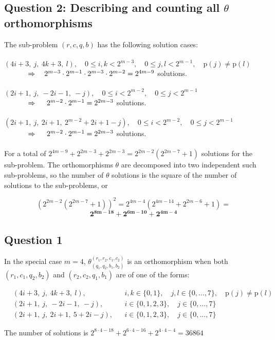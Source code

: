 \documentclass[11pt]{llncs}
\begin{document}
\subsection{Question 2: Describing and counting all $\theta$ orthomorphisms}

The sub-problem $(r,c,q,b)$ has the following solution cases:\\\\
$(4i+3,\ j,\ 4k+3,\ l),\quad 0 \leq i, k < 2^{m-3},\quad 0 \leq j, l < 2^{m-1},\quad\text{p}(j)\neq\text{p}(l)$\\
$\hphantom{ }\quad\quad\quad\Rightarrow\quad 2^{m-3} \cdot 2^{m-1} \cdot 2^{m-3} \cdot 2^{m-2} = 2^{4m-9}$ solutions.\\\\
$(2i+1,\ j,\ -2i-1,\ -j),\quad 0 \leq i < 2^{m-2},\quad 0 \leq j < 2^{m-1}$\\
$\hphantom{ }\quad\quad\quad\Rightarrow\quad\ 2^{m-2} \cdot 2^{m-1} = 2^{2m-3}$ solutions.\\\\
$(2i+1,\ j,\ 2i+1,\ 2^{m-2}+2i+1-j),\quad 0 \leq i < 2^{m-2},\quad 0 \leq j < 2^{m-1}$\\
$\hphantom{ }\quad\quad\quad\Rightarrow\quad\ 2^{m-2} \cdot 2^{m-1} = 2^{2m-3}$ solutions.\\\\
For a total of $2^{4m-9} + 2^{2m-3} + 2^{2m-3} = 2^{2m-2}(2^{2m-7}+1)$ solutions for the sub-problem. The orthomorphisms $\theta$ are decomposed into two independent such sub-problems, so the number of $\theta$ solutions is the square of the number of solutions to the sub-problems, or

\[ (2^{2m-2}(2^{2m-7}+1))^2 = 2^{4m-4}(2^{4m-14} + 2^{2m-6} + 1) = \]
\LARGE \[ \mathbf{ 2^{8m-18} + 2^{6m-10} + 2^{4m-4} } \] \normalsize

\subsection{Question 1}

In the special case $m=4$, $\theta^{(r_1, r_2, c_1, c_2)}_{(q_1, q_2, b_1, b_2)}$ is an orthomorphism when both $(r_1, c_1, q_2, b_2)$ and $(r_2, c_2, q_1, b_1)$ are of one of the forms:

\[ \begin{aligned}
& (4i+3,\ j,\ 4k+3,\ l),& & i, k \in \{0,1\},\quad j, l \in \{0,\dots,7\},\quad\text{p}(j)\neq\text{p}(l) \\
& (2i+1,\ j,\ -2i-1,\ -j),& & i \in \{0,1,2,3\},\quad j \in \{0,\dots,7\} \\
& (2i+1,\ j,\ 2i+1,\ 5+2i-j),& & i \in \{0,1,2,3\},\quad j \in \{0,\dots,7\}
\end{aligned} \]

The number of solutions is $2^{8\cdot 4-18}+2^{6\cdot 4-16}+2^{4\cdot 4-4}=36864$
\end{document}
